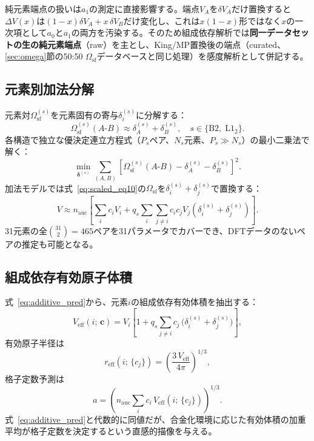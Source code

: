 \documentclass[5p,10pt]{elsarticle}
\begin{document}
純元素端点の扱いは$a_1$の測定に直接影響する。端点$V_A$を$\delta V_A$だけ置換すると$\Delta V(x)$は$(1-x)\delta V_A + x\,\delta V_B$だけ変化し、これは$x(1-x)$形ではなく$x$の一次項として$a_0$と$a_1$の両方を汚染する。そのため組成依存解析では\textbf{同一データセットの生の純元素端点}（raw）を主とし、King/MP置換後の端点（curated、\ref{sec:omega}節の50:50 $\Omega_\text{sf}$データベースと同じ処理）を感度解析として併記する。


\subsection{元素別加法分解}
\label{sec:additive}

元素対$\Omega_\text{sf}^{(s)}$を元素固有の寄与$\delta_i^{(s)}$に分解する：
\begin{equation}
  \Omega_\text{sf}^{(s)}(A\text{-}B)
  \approx \delta_A^{(s)} + \delta_B^{(s)},
  \quad s \in \{\text{B2},\;\text{L1}_2\}.
  \label{eq:additive}
\end{equation}
各構造で独立な優決定連立方程式（$P_s$ペア、$N_s$元素、$P_s \gg N_s$）の最小二乗法で解く：
\begin{equation}
  \min_{\boldsymbol{\delta}^{(s)}} \sum_{(A,B)}
    \left[\Omega_\text{sf}^{(s)}(A\text{-}B)
    - \delta_A^{(s)} - \delta_B^{(s)}\right]^2.
  \label{eq:additive_lsq}
\end{equation}
加法モデルでは式~\eqref{eq:scaled_eq10}の$\Omega_\text{sf}$を$\delta_i^{(s)} + \delta_j^{(s)}$で置換する：
\begin{equation}
  V \approx n_\text{auc} \!\left[
    \sum_i c_i V_i + q_s \sum_i \sum_{j \ne i}
    c_i c_j V_j (\delta_i^{(s)} + \delta_j^{(s)})
  \right]\!.
  \label{eq:additive_pred}
\end{equation}
31元素の全$\binom{31}{2} = 465$ペアを31パラメータでカバーでき、DFTデータのないペアの推定も可能となる。


\subsection{組成依存有効原子体積}
\label{sec:veff}

式~\eqref{eq:additive_pred}から、元素$i$の組成依存有効体積を抽出する：
\begin{equation}
  V_\text{eff}(i;\, \mathbf{c})
  = V_i \!\left[1 + q_s \sum_{j \ne i} c_j\,
    \bigl(\delta_i^{(s)} + \delta_j^{(s)}\bigr)\right]\!,
  \label{eq:veff}
\end{equation}
有効原子半径は
\begin{equation}
  r_\text{eff}(i;\, \{c_j\})
  = \left(\frac{3\,V_\text{eff}}{4\pi}\right)^{\!1/3}\!,
  \label{eq:reff}
\end{equation}
格子定数予測は
\begin{equation}
  a = \left(n_\text{auc} \sum_i c_i\, V_\text{eff}(i;\, \{c_j\})
  \right)^{\!1/3}\!.
  \label{eq:a_from_veff}
\end{equation}
式~\eqref{eq:additive_pred}と代数的に同値だが、合金化環境に応じた有効体積の加重平均が格子定数を決定するという直感的描像を与える。
\end{document}
